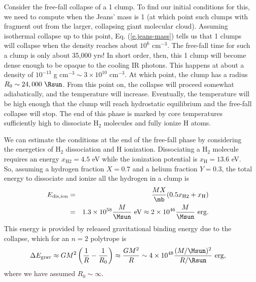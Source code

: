 Consider the free-fall collapse of a 1 \Msun clump.
To find our initial conditions for this, we need to compute when the Jeans' mass is 1 \Msun (at which point such clumps with fragment out from the larger, collapsing giant molecular cloud).
Assuming isothermal collapse up to this point, Eq. (\ref{e.jeans-mass}) tells us that 1 \Msun clumps will collapse when the density reaches about $10^6$ cm$^{-3}$.
The free-fall time for such a clump is only about 35,000 yrs!
In short order, then, this 1 \Msun clump will become dense enough to be opaque to the cooling IR photons.
This happens at about a density of $10^{-13}$ g cm$^{-3} \sim 3\times10^{10}$ cm$^{-3}$.
At which point, the clump has a radius $R_0 \sim 24,000\ \Rsun$.
From this point on, the collapse will proceed somewhat adiabatically, and the temperature will increase.
Eventually, the temperature will be high enough that the clump will reach hydrostatic equilibrium and the free-fall collapse will stop.
The end of this phase is marked by core temperatures sufficiently high to dissociate H$_2$ molecules and fully ionize H atoms.

We can estimate the conditions at the end of the free-fall phase by considering the energetics of H$_2$ dissociation and H ionization.
Dissociating a H$_2$ molecule requires an energy $x_\mathrm{H2}=4.5$ eV while the ionization potential is $x_\mathrm{H}=13.6$ eV.
So, assuming a hydrogen fraction $X=0.7$ and a helium fraction $Y=0.3$, the total energy to dissociate and ionize all the hydrogen in a clump is
\begin{eqnarray*}
  E_\mathrm{dis,ion} &=& \frac{M X}{\mb}(0.5x_\mathrm{H2} + x_\mathrm{H}) \\
  &=& 1.3\times10^{58} \frac{M}{\Msun}\ \mathrm{eV} \approx 2\times10^{46} \frac{M}{\Msun}\ \mathrm{erg}.
\end{eqnarray*}
This energy is provided by released gravitational binding energy due to the collapse, which for an $n=2$ polytrope is
\begin{eqnarray*}
  \Delta E_\mathrm{grav} \approx G M^2 \left (\frac{1}{R} - \frac{1}{R_0}\right) \approx \frac{G M^2}{R} \sim 4\times10^{48} \frac{(M/\Msun)^2}{R/\Rsun}\ \mathrm{erg},
\end{eqnarray*}
where we have assumed $R_0 \sim \infty$.

